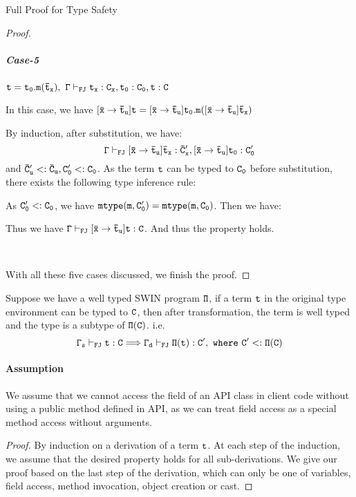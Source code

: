 \begin{section}{Full Proof for Type Safety}
\begin{proof}
\subparagraph{Case-5} $\tt t=t_0.m(\bar{t}_x),\ \Gamma\vdash_{FJ} t_x:C_x, t_0:C_0, t:C$
\par
In this case, we have $\tt [\bar{x}\rightarrow\bar{t}_u]t=[\bar{x}\rightarrow\bar{t}_u]t_0.m([\bar{x}\rightarrow\bar{t}_u]\bar{t}_x)$
\par
By induction, after substitution, we have: $$\tt \Gamma\vdash_{FJ} [\bar{x}\rightarrow\bar{t}_u]\bar{t}_x:\bar{C}'_x,[\bar{x}\rightarrow\bar{t}_u]t_0:C'_0$$ and $\tt \bar{C}'_u<:\bar{C}_u, C'_0<:C_0$. 
As the term $\tt t$ can be typed to $\tt C_0$ before substitution, there exists the following type inference rule:
\begin{center}
\noLine
{}
\DP
\end{center}
As $\tt C'_0 <: C_0$, we have $\tt mtype(m,C'_0)=mtype(m, C_0)$. Then we have:
\begin{center}
\noLine
{}
\DP
\end{center}
Thus we have $\tt \Gamma\vdash_{FJ} [\bar{x}\rightarrow\bar{t}_u]t:C$. And thus the property holds.
\par
\ 
\par
With all these five cases discussed, we finish the proof. 
\end{proof}

\begin{lemma}
Suppose we have a well typed SWIN program $\tt \Pi$, if a term $\tt t$ in the original type environment can be typed to $\tt C$, then after transformation, the term is well typed and the type is a subtype of $\tt \Pi(C)$. i.e.
$$\tt \Gamma_s\vdash_{FJ} t:C \Longrightarrow \Gamma_d\vdash_{FJ} \Pi(t):C',\ where\ C'<:\Pi(C)$$
\end{lemma}
\paragraph{Assumption} We assume that we cannot access the field of an API class in client code without using a public method defined in API, as we can treat field access as a special method access without arguments.
\begin{proof}
By induction on a derivation of a term $\tt t$. At each step of the induction, we assume that the desired property holds for all sub-derivations.
We give our proof based on the last step of the derivation, which can only be one of variables, field access, method invocation, object creation or cast.

\end{proof}
\end{section}

